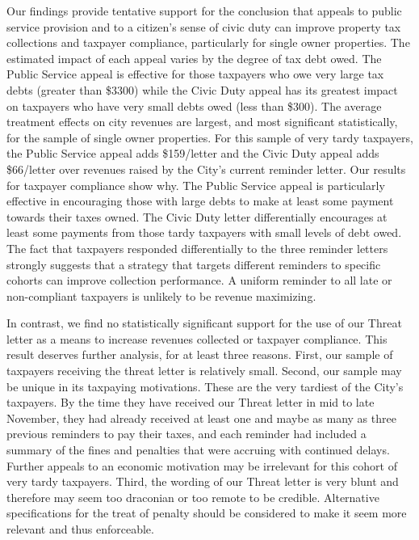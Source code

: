 \documentclass[12pt,titlepage]{article}
\begin{document}
Our findings provide tentative support for the conclusion that appeals
to public service provision and to a citizen's sense of civic duty can
improve property tax collections and taxpayer compliance, particularly
for single owner properties.  The estimated impact of each appeal
varies by the degree of tax debt owed.  The Public Service appeal is
effective for those taxpayers who owe very large tax debts (greater
than \$3300) while the Civic Duty appeal has its greatest impact on
taxpayers who have very small debts owed (less than \$300).  The
average treatment effects on city revenues are largest, and most
significant statistically, for the sample of single owner properties.
For this sample of very tardy taxpayers, the Public Service appeal
adds \$159/letter and the Civic Duty appeal adds \$66/letter over
revenues raised by the City's current reminder letter.  Our results
for taxpayer compliance show why.  The Public Service appeal is
particularly effective in encouraging those with large debts to make
at least some payment towards their taxes owned.  The Civic Duty
letter differentially encourages at least some payments from those
tardy taxpayers with small levels of debt owed.  The fact that
taxpayers responded differentially to the three reminder letters
strongly suggests that a strategy that targets different reminders to
specific cohorts can improve collection performance.  A uniform
reminder to all late or non-compliant taxpayers is unlikely to be
revenue maximizing.
	
In contrast, we find no statistically significant support for the use
of our Threat letter as a means to increase revenues collected or
taxpayer compliance.  This result deserves further analysis, for at
least three reasons.  First, our sample of taxpayers receiving the
threat letter is relatively small.  Second, our sample may be unique
in its taxpaying motivations.  These are the very tardiest of the
City's taxpayers.  By the time they have received our Threat letter in
mid to late November, they had already received at least one and maybe
as many as three previous reminders to pay their taxes, and each
reminder had included a summary of the fines and penalties that were
accruing with continued delays.  Further appeals to an economic
motivation may be irrelevant for this cohort of very tardy taxpayers.
Third, the wording of our Threat letter is very blunt and therefore
may seem too draconian or too remote to be credible.  Alternative
specifications for the treat of penalty should be considered to make
it seem more relevant and thus enforceable.
	
\end{document}

